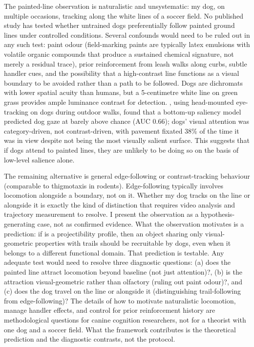 \documentclass[12pt]{article}
\begin{document}
The painted-line observation is naturalistic and unsystematic: my dog, on multiple occasions, tracking along the white lines of a soccer field. No published study has tested whether untrained dogs preferentially follow painted ground lines under controlled conditions. Several confounds would need to be ruled out in any such test: paint odour (field-marking paints are typically latex emulsions with volatile organic compounds that produce a sustained chemical signature, not merely a residual trace), prior reinforcement from leash walks along curbs, subtle handler cues, and the possibility that a high-contrast line functions as a visual boundary to be avoided rather than a path to be followed. Dogs are dichromats with lower spatial acuity than humans, but a 5-centimetre white line on green grass provides ample luminance contrast for detection. \textcite{pelgrim2025}, using head-mounted eye-tracking on dogs during outdoor walks, found that a bottom-up saliency model predicted dog gaze at barely above chance (AUC 0.66); dogs' visual attention was category-driven, not contrast-driven, with pavement fixated 38\% of the time it was in view despite not being the most visually salient surface. This suggests that if dogs attend to painted lines, they are unlikely to be doing so on the basis of low-level salience alone.

The remaining alternative is general edge-following or contrast-tracking behaviour (comparable to thigmotaxis in rodents). Edge-following typically involves locomotion alongside a boundary, not on it. Whether my dog tracks on the line or alongside it is exactly the kind of distinction that requires video analysis and trajectory measurement to resolve. I present the observation as a hypothesis-generating case, not as confirmed evidence. What the observation motivates is a prediction: if  is a projectibility profile, then an object sharing only visual-geometric properties with trails should be recruitable by dogs, even when it belongs to a different functional domain. That prediction is testable. Any adequate test would need to resolve three diagnostic questions: (a) does the painted line attract locomotion beyond baseline (not just attention)?, (b) is the attraction visual-geometric rather than olfactory (ruling out paint odour)?, and (c) does the dog travel on the line or alongside it (distinguishing trail-following from edge-following)? The details of how to motivate naturalistic locomotion, manage handler effects, and control for prior reinforcement history are methodological questions for canine cognition researchers, not for a theorist with one dog and a soccer field. What the framework contributes is the theoretical prediction and the diagnostic contrasts, not the protocol.
\end{document}
